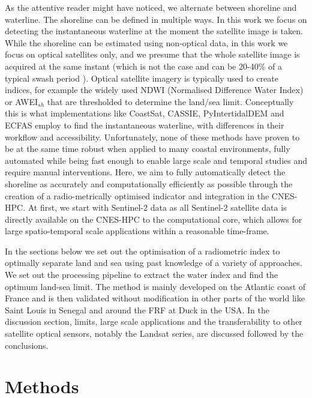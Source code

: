 \documentclass[remotesensing,article,submit,pdftex,moreauthors]{Definitions/mdpi}
\begin{document}
As the attentive reader might have noticed, we alternate between shoreline and waterline. The shoreline can be defined in multiple ways. In this work we focus on detecting the instantaneous waterline at the moment the satellite image is taken. While the shoreline can be estimated using non-optical data, in this work we focus on optical satellites only, and we presume that the whole satellite image is acquired at the same instant (which is not the case and can be 20-40\% of a typical swash period \citep{binet2022accurate}). Optical satellite imagery is typically used to create indices, for example the widely used NDWI (Normalised Difference Water Index) or AWEI$_{sh}$ that are thresholded to determine the land/sea limit. Conceptually this is what implementations like CoastSat\citep{VOS2019_google}, CASSIE\citep{ALMEIDA2021_Cassie}, PyIntertidalDEM\citep{Khan2019} and ECFAS employ to find the instantaneous waterline, with differences in their workflow and accessibility. Unfortunately, none of these methods have proven to be at the same time robust when applied to many coastal environments, fully automated while being fast enough to enable large scale and temporal studies and require manual interventions. Here, we aim to fully automatically detect the shoreline as accurately and computationally efficiently as possible through the creation of a radio-metrically optimised indicator and integration in the CNES-HPC. At first, we start with Sentinel-2 data as all Sentinel-2 satellite data is directly available on the CNES-HPC to the computational core, which allows for large spatio-temporal scale applications within a reasonable time-frame.

In the sections below we set out the optimisation of a radiometric index to optimally separate land and sea using past knowledge of a variety of approaches. We set out the processing pipeline to extract the water index and find the optimum land-sea limit. The method is mainly developed on the Atlantic coast of France and is then validated without modification in other parts of the world like Saint Louis in Senegal and around the FRF at Duck in the USA. In the discussion section, limits, large scale applications and the transferability to other satellite optical sensors, notably the Landsat series, are discussed followed by the conclusions.

\section{Methods}
\end{document}
